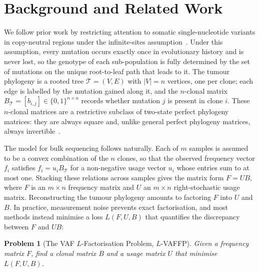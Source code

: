 \documentclass[11pt]{article}
\newtheorem{problem}[theorem]{Problem}
\begin{document}
\section{Background and Related Work}
\label{sec:background}

We follow prior work by restricting attention to somatic single-nucleotide variants in copy-neutral regions under the infinite-sites assumption~\citep{elkebir2015reconstruction,deshwar2015phylowgs,popic2015lichee,malikic2015citup,roth2014pyclone,satas2017pastri,myers2019calder,wintersinger2022pairtree}. Under this assumption, every mutation occurs exactly once in evolutionary history and is never lost, so the genotype of each sub-population is fully determined by the set of mutations on the unique root-to-leaf path that leads to it. The tumour phylogeny is a rooted tree $\mathcal{T}=(V,E)$ with $|V|=n$ vertices, one per clone; each edge is labelled by the mutation gained along it, and the $n$-clonal matrix $B_{\mathcal{T}}=[b_{i,j}]\in\{0,1\}^{n\times n}$ records whether mutation $j$ is present in clone $i$. These $n$-clonal matrices are a restrictive subclass of two-state perfect phylogeny matrices: they are always square and, unlike general perfect phylogeny matrices, always invertible~\citep{elkebir2015reconstruction}.

The model for bulk sequencing follows naturally. Each of $m$ samples is assumed to be a convex combination of the $n$ clones, so that the observed frequency vector $f_i$ satisfies $f_i = u_i B_{\mathcal{T}}$ for a non-negative usage vector $u_i$ whose entries sum to at most one. Stacking these relations across samples gives the matrix form $F = U B$, where $F$ is an $m\times n$ frequency matrix and $U$ an $m\times n$ right-stochastic usage matrix. Reconstructing the tumour phylogeny amounts to factoring $F$ into $U$ and $B$. In practice, measurement noise prevents exact factorisation, and most methods instead minimise a loss $L(F, U, B)$ that quantifies the discrepancy between $F$ and $UB$:

\begin{problem}[The VAF $L$-Factorisation Problem, $L$-VAFFP]
Given a frequency matrix $F$, find a clonal matrix $B$ and a usage matrix $U$ that minimise $L(F, U, B)$.
\end{problem}
\end{document}
